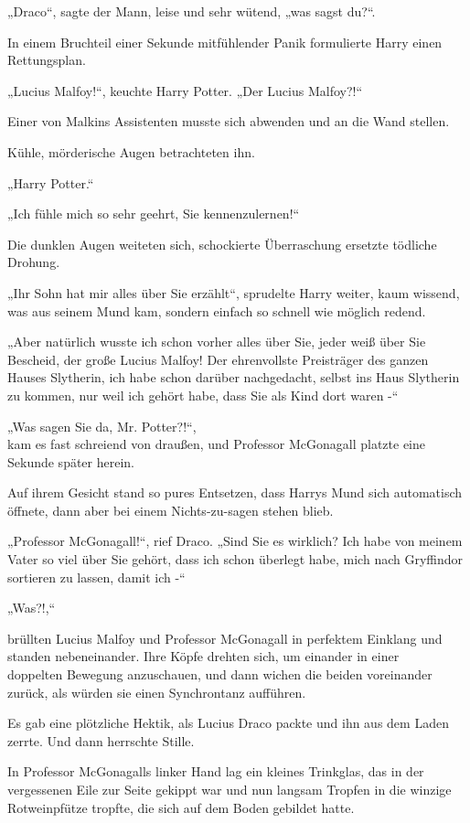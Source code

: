 {„Draco“, sagte der Mann, leise und sehr wütend, „was sagst du?“.

In einem Bruchteil einer Sekunde mitfühlender Panik formulierte Harry einen Rettungsplan.

„Lucius Malfoy!“, keuchte Harry Potter. „Der Lucius Malfoy?!“

Einer von Malkins Assistenten musste sich abwenden und an die Wand stellen.

Kühle, mörderische Augen betrachteten ihn.

„Harry Potter.“

„Ich fühle mich so sehr geehrt, Sie kennenzulernen!“

Die dunklen Augen weiteten sich, schockierte Überraschung ersetzte tödliche Drohung.

„Ihr Sohn hat mir alles über Sie erzählt“, sprudelte Harry weiter, kaum wissend, was aus seinem Mund kam, sondern einfach so schnell wie möglich redend.

„Aber natürlich wusste ich schon vorher alles über Sie, jeder weiß über Sie Bescheid, der große Lucius Malfoy! Der ehrenvollste Preisträger des ganzen Hauses Slytherin, ich habe schon darüber nachgedacht, selbst ins Haus Slytherin zu kommen, nur weil ich gehört habe, dass Sie als Kind dort waren -“

„Was sagen Sie da, Mr. Potter?!“,\\ kam es fast schreiend von draußen, und Professor McGonagall platzte eine Sekunde später herein.

Auf ihrem Gesicht stand so pures Entsetzen, dass Harrys Mund sich automatisch öffnete, dann aber bei einem Nichts-zu-sagen stehen blieb.

„Professor McGonagall!“, rief Draco. „Sind Sie es wirklich? Ich habe von meinem Vater so viel über Sie gehört, dass ich schon überlegt habe, mich nach Gryffindor sortieren zu lassen, damit ich -“

„Was?!,“

brüllten Lucius Malfoy und Professor McGonagall in perfektem Einklang und standen nebeneinander. Ihre Köpfe drehten sich, um einander in einer\\ doppelten Bewegung anzuschauen, und dann wichen die beiden voreinander zurück, als würden sie einen Synchrontanz aufführen.

Es gab eine plötzliche Hektik, als Lucius Draco packte und ihn aus dem Laden zerrte. Und dann herrschte Stille.

In Professor McGonagalls linker Hand lag ein kleines Trinkglas, das in der vergessenen Eile zur Seite gekippt war und nun langsam Tropfen in die winzige Rotweinpfütze tropfte, die sich auf dem Boden gebildet hatte.

}
